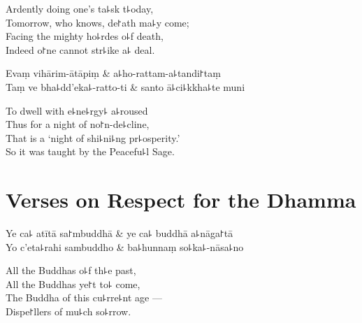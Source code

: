 \begin{english}
  Ardently doing one's ta꜕sk t꜕oday,\\
  Tomorrow, who knows, de꜓ath ma꜕y come;\\
  Facing the mighty ho꜕rdes o꜕f death,\\
  Indeed o꜓ne cannot str꜕ike a꜕ deal.
\end{english}

\begin{twochants}
  Evaṃ vihārim-ātāpiṃ & a꜕ho-rattam-a꜕tandi꜓taṃ \\
  Taṃ ve bha꜕dd'eka꜕-ratto-ti & santo ā꜕ci꜕kkha꜕te muni \\
\end{twochants}


\begin{english}
  To dwell with e꜕ne꜕rgy꜕ a꜕roused\\
  Thus for a night of no꜓n-de꜕cline,\\
  That is a `night of shi꜕ni꜕ng pr꜕osperity.'\\
  So it was taught by the Peacefu꜕l Sage.
\end{english}

\chapter{Verses on Respect for the Dhamma}%



\begin{leader}
\end{leader}

\begin{twochants}
  Ye ca꜕ atītā sa꜓mbuddhā & ye ca꜕ buddhā a꜕nāga꜓tā \\
  Yo c'eta꜕rahi sambuddho & ba꜕hunnaṃ so꜕ka꜕-nāsa꜕no \\
\end{twochants}

\begin{english}
  All the Buddhas o꜕f th꜕e past,\\
  All the Buddhas ye꜓t to꜕ come,\\
  The Buddha of this cu꜕rre꜕nt age ---\\
  Dispe꜓llers of mu꜕ch so꜕rrow.
\end{english}

